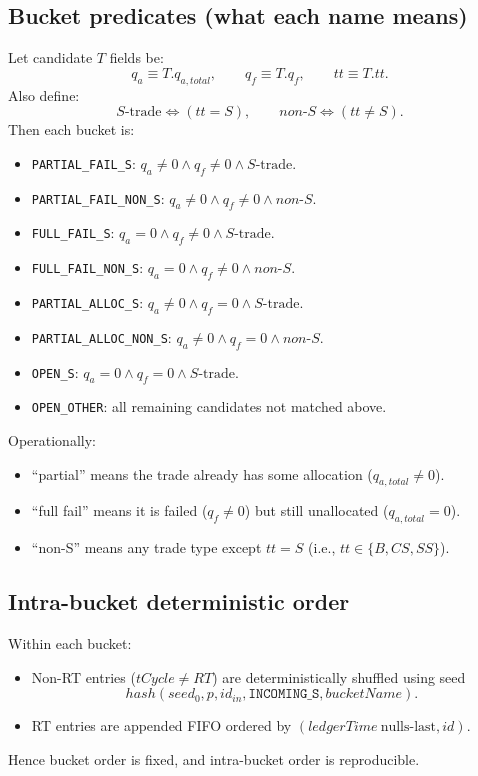 \documentclass[sigconf]{acmart}
\begin{document}
\subsection{Bucket predicates (what each name means)}
Let candidate $T$ fields be:
\[
q_a \equiv T.q_{a,total},\qquad q_f \equiv T.q_f,\qquad tt \equiv T.tt.
\]
Also define:
\[
S\text{-trade}\iff (tt=S),\qquad non\text{-}S\iff (tt\neq S).
\]
Then each bucket is:
\begin{itemize}[leftmargin=*]
  \item \texttt{PARTIAL\_FAIL\_S}: $q_a\neq 0 \land q_f\neq 0 \land S\text{-trade}$.
  \item \texttt{PARTIAL\_FAIL\_NON\_S}: $q_a\neq 0 \land q_f\neq 0 \land non\text{-}S$.
  \item \texttt{FULL\_FAIL\_S}: $q_a=0 \land q_f\neq 0 \land S\text{-trade}$.
  \item \texttt{FULL\_FAIL\_NON\_S}: $q_a=0 \land q_f\neq 0 \land non\text{-}S$.
  \item \texttt{PARTIAL\_ALLOC\_S}: $q_a\neq 0 \land q_f=0 \land S\text{-trade}$.
  \item \texttt{PARTIAL\_ALLOC\_NON\_S}: $q_a\neq 0 \land q_f=0 \land non\text{-}S$.
  \item \texttt{OPEN\_S}: $q_a=0 \land q_f=0 \land S\text{-trade}$.
  \item \texttt{OPEN\_OTHER}: all remaining candidates not matched above.
\end{itemize}

Operationally:
\begin{itemize}[leftmargin=*]
  \item ``partial'' means the trade already has some allocation ($q_{a,total}\neq 0$).
  \item ``full fail'' means it is failed ($q_f\neq 0$) but still unallocated ($q_{a,total}=0$).
  \item ``non-S'' means any trade type except $tt=S$ (i.e., $tt\in\{B,CS,SS\}$).
\end{itemize}

\subsection{Intra-bucket deterministic order}
Within each bucket:
\begin{itemize}[leftmargin=*]
  \item Non-RT entries ($tCycle\neq RT$) are deterministically shuffled using seed
  \[
  hash(seed_0,p,id_{in},\texttt{INCOMING\_S},bucketName).
  \]
  \item RT entries are appended FIFO ordered by $(ledgerTime\ \text{nulls-last},id)$.
\end{itemize}
Hence bucket order is fixed, and intra-bucket order is reproducible.
\end{document}
